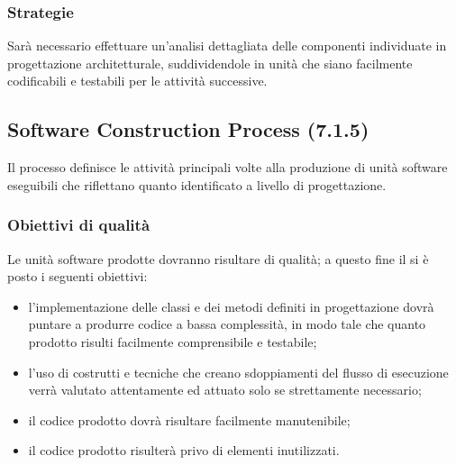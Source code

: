 \subsubsection{Strategie}
Sarà necessario effettuare un'analisi dettagliata delle componenti individuate in progettazione architetturale, suddividendole in unità che siano facilmente codificabili e testabili per le attività successive.
\subsection{Software Construction Process (7.1.5)}
\label{soConstruction}
Il processo definisce le attività principali volte alla produzione di unità software eseguibili che riflettano quanto identificato a livello di progettazione.
\subsubsection{Obiettivi di qualità}
Le unità software prodotte dovranno risultare di qualità; a questo fine il  si è posto i seguenti obiettivi:
\begin{itemize}
\item l'implementazione delle classi e dei metodi definiti in progettazione dovrà puntare a produrre codice a bassa complessità, in modo tale che quanto prodotto risulti facilmente comprensibile e testabile;
\item l'uso di costrutti e tecniche che creano sdoppiamenti del flusso di esecuzione verrà valutato attentamente ed attuato solo se strettamente necessario;
\item il codice prodotto dovrà risultare facilmente manutenibile;
\item il codice prodotto risulterà privo di elementi inutilizzati.
\end{itemize}

